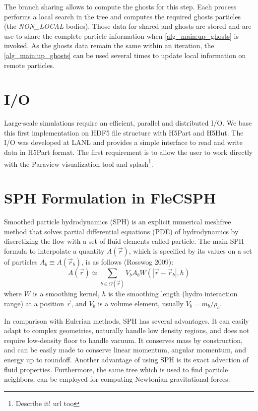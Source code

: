 \documentclass{article}
\begin{document}
The branch sharing allows to compute the ghosts for this step.
Each process performs a local search in the tree and computes the required
ghosts particles (the \textit{NON\_LOCAL} bodies).
Those data for shared and ghosts are stored and are use to share the complete
particle information when \ref{alg_main:up_ghosts} is invoked.
As the ghosts data remain the same within an iteration, the
\ref{alg_main:up_ghosts} can be used several times to update local information
on remote particles.

\section{I/O}
Large-scale simulations require an efficient, parallel and distributed I/O.
We base this first implementation on HDF5 file structure with H5Part and H5Hut.
The I/O was developed at LANL and provides a simple interface to read and write
data in H5Part format.
The first requirement is to allow the user to work directly with the Paraview
visualization tool and splash\footnote{Describe it! url too}.


\section{SPH Formulation in FleCSPH}
Smoothed particle hydrodynamics (SPH) is an explicit numerical meshfree method
that solves partial differential equations (PDE) of hydrodynamics by
discretizing the flow with a set of fluid elements called particle. 
The main SPH formula to interpolate a quantity $A(\vec{r})$, which is
specified by its values on a set of particles $A_b \equiv A(\vec{r}_b)$, 
is as follows (Rosswog 2009):
\begin{equation}
A(\vec{r}) \simeq \sum_{b\in\Omega(\vec{r})} V_b A_b W(|\vec{r}-\vec{r}_b|,h)
\end{equation}
where $W$ is a smoothing kernel, 
$h$ is the smoothing length (hydro interaction range) at a position $\vec{r}$, 
and $V_b$ is a volume element, usually $V_b = m_b/\rho_b$.

In comparison with Eulerian methods, SPH has several advantages. It can easily
adapt to complex geometries, naturally handle low density regions, and does
not require low-density floor to handle vacuum. It conserves mass by
construction, and can be easily made to conserve linear momentum, angular
momentum, and energy up to roundoff. Another advantage of using SPH is its
exact advection of fluid properties. Furthermore, the same tree which is used
to find particle neighbors, can be employed for computing Newtonian
gravitational forces.
\end{document}

